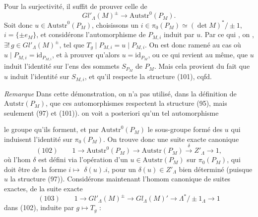 \documentclass[11pt,a4paper]{article}
\begin{document}

Pour la surjectivité, il suffit de prouver celle de
\[
  Gl'_{\Lambda}(M)^{\pm} \longrightarrow \mathrm{Autstr}^{0}(P_M) .
\]
Soit donc $u\in \mathrm{Autstr}^{0}(P_M)$, choisissons un \struck{\ill{}}
$i \in \pi_0(P_M) \simeq (\det M)^{*}/\pm 1$, $i=\{\pm e_M\}$, et considérons
l'automorphisme de $P_{M,i}$ induit par $u$. Par ce qui , on
, $\exists !\, g \in Gl'_{\Lambda}(M)^{\pm}$, tel que
$T_g \mid P_{M,i} = u \mid P_{M,i}$. On est donc ramené au cas où \struck{\ill{}}
$u \mid P_{M,i} = \mathrm{id}_{P_{M,i}}$, et à prouver qu'alors
$u=\mathrm{id}_{P_M}$, ou ce qui revient au même, que $u$ induit l'identité sur
\struck{\ill{}} l'ens des sommets $S_{P_M}$ de $P_M$. Mais cela provient du fait
que $u$ induit l'identité sur  $S_{M,i}$, et qu'il respecte
la \struck{\ill{}} structure (101), cqfd.

\emph{Remarque} Dans cette démonstration, on n'a pas utilisé, dans la définition
de $\mathrm{Autstr}(P_M)$, que ces automorphismes respectent la structure 
 (95), mais seulement (97) et (101)).  on
voit a posteriori qu'un tel automorphisme


le groupe qu'ils forment, et par $\mathrm{Autstr}^{0}(P_M)$ le sous-groupe formé
des $u$ qui induisent l'identité sur $\pi_0(P_M)$. On trouve donc une suite exacte
canonique
\[
  (102)\qquad 1 \longrightarrow \mathrm{Autstr}^{0}(P_M) \longrightarrow
  \mathrm{Autstr}(P_M) \xrightarrow{\ \delta\ } Z'_{\Lambda} \longrightarrow 1,
\]
où l'hom $\delta$ est défini via l'opération d'un $u\in\mathrm{Autstr}(P_M)$ sur
$\pi_0(P_M)$, qui doit être \struck{\ill{}} de la forme
$i \longmapsto$ \struck{\ill{}} $\delta(u).i$, pour un $\delta(u)\in Z'_{\Lambda}$
bien déterminé (puisque $u$   la structure (97)).
Considérons maintenant l'homom canonique de suites exactes, 
 de la suite exacte
\[
  (103)\qquad 1 \longrightarrow Gl'_{\Lambda}(M)^{\pm} \longrightarrow
  Gl_{\Lambda}(M)' \longrightarrow \Lambda^{*}/\pm 1_{\Lambda} \longrightarrow 1
\]
dans (102), induite par $g \longmapsto T_g$ :
\end{document}
